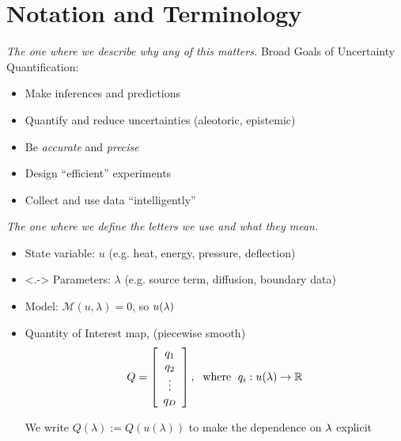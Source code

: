 %


\section{Notation and Terminology}
\begin{frame}[t]{\it The one where we describe why any of this matters.}
\centering
	Broad Goals of Uncertainty Quantification:
	\vskip 10pt
    \begin{itemize}
	    \item Make inferences and predictions
	    \vskip 20pt
        \item Quantify and reduce uncertainties (aleotoric, epistemic)
	    \vskip 20pt
	    \item Be \emph{accurate} and \emph{precise}
	    \vskip 20pt
	    \item Design ``efficient'' experiments
	    \vskip 20pt
	    \item Collect and use data ``intelligently''
    \end{itemize}

\end{frame}

\begin{frame}[t]{\it The one where we define the letters we use and what they mean.}
\begin{itemize}
	\item State variable: $u$ {\color{gray}(e.g. heat, energy, pressure, deflection)}
	\vskip 10pt
	\item<.-> Parameters: $\lambda$ {\color{gray}(e.g. source term, diffusion, boundary data)}
	\vskip 10pt
		\item Model: $\mathcal{M} (u, \lambda) = 0$, so $u(\param)$

	\item Quantity of Interest  map, (piecewise smooth) \vskip 5pt
		$$Q = \mat{c}{q_1\\ q_2\\ \vdots \\ q_\dimD}, \; \text{ where } \; q_i: u(\lambda) \to \RR$$

We write $Q(\lambda) := Q(u(\lambda))$ to make the dependence on $\param$ explicit

\end{itemize}

\end{frame}


